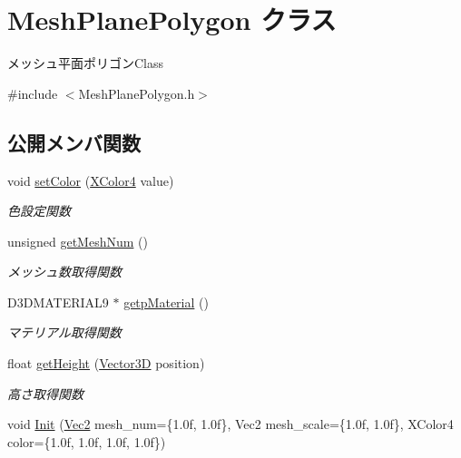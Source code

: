 \hypertarget{class_mesh_plane_polygon}{}\section{Mesh\+Plane\+Polygon クラス}
\label{class_mesh_plane_polygon}


メッシュ平面ポリゴン\+Class  




{\ttfamily \#include $<$Mesh\+Plane\+Polygon.\+h$>$}

\subsection*{公開メンバ関数}
\begin{DoxyCompactItemize}
\item 
void \mbox{\hyperlink{class_mesh_plane_polygon_aa722084072913bad01fc86add2777a47}{set\+Color}} (\mbox{\hyperlink{_vector3_d_8h_a680c30c4a07d86fe763c7e01169cd6cc}{X\+Color4}} value)
\begin{DoxyCompactList}\small\item\em 色設定関数 \end{DoxyCompactList}\item 
unsigned \mbox{\hyperlink{class_mesh_plane_polygon_a1850ae9039b99d29b709b17224b49fa5}{get\+Mesh\+Num}} ()
\begin{DoxyCompactList}\small\item\em メッシュ数取得関数 \end{DoxyCompactList}\item 
D3\+D\+M\+A\+T\+E\+R\+I\+A\+L9 $\ast$ \mbox{\hyperlink{class_mesh_plane_polygon_a77860c05db625178d9063edced585c3f}{getp\+Material}} ()
\begin{DoxyCompactList}\small\item\em マテリアル取得関数 \end{DoxyCompactList}\item 
float \mbox{\hyperlink{class_mesh_plane_polygon_af5340ac623c506777b3bb41dbecf2a53}{get\+Height}} (\mbox{\hyperlink{class_vector3_d}{Vector3D}} position)
\begin{DoxyCompactList}\small\item\em 高さ取得関数 \end{DoxyCompactList}\item 
void \mbox{\hyperlink{class_mesh_plane_polygon_a9129597b5989b340fd9a5f11004fbdd2}{Init}} (\mbox{\hyperlink{_vector3_d_8h_a5ef6e95dfc5f9d3820b71772d99bbc25}{Vec2}} mesh\+\_\+num=\{1.\+0f, 1.\+0f\}, Vec2 mesh\+\_\+scale=\{1.\+0f, 1.\+0f\}, X\+Color4 color=\{1.\+0f, 1.\+0f, 1.\+0f, 1.\+0f\})

\end{DoxyCompactItemize}
